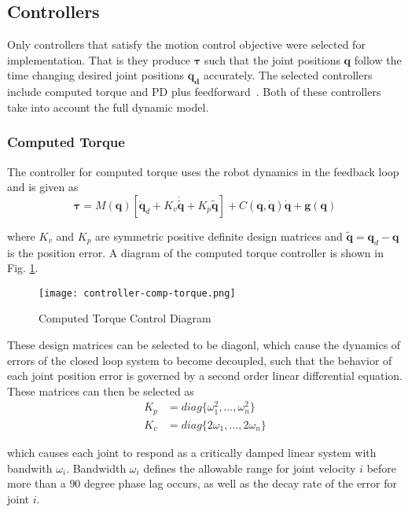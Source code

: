 \documentclass[conference]{IEEEtran}
\begin{document}
\subsection{Controllers}
Only controllers that satisfy the motion control objective were selected for
implementation. That is they produce $\boldsymbol{\tau}$ such that the joint
positions $\boldsymbol{q}$ follow the time changing desired joint positions
$\boldsymbol{q_d}$ accurately. The selected controllers include computed torque
and PD plus feedforward~\cite{kelly2007control}. Both of these controllers take
into account the full dynamic model.

\subsubsection{Computed Torque}
The controller for computed torque uses the robot dynamics in the feedback loop
and is given as
\begin{equation*}
  \boldsymbol{\tau} = M(\boldsymbol{q}) \left [ \ddot{\boldsymbol{q}}_d + K_v \dot{\tilde{\boldsymbol{q}}} + K_p \tilde{\boldsymbol{q}} \right ] + C(\boldsymbol{q}, \dot{\boldsymbol{q}})\dot{\boldsymbol{q}} + \boldsymbol{g}(\boldsymbol{q})
\end{equation*}

where $K_v$ and $K_p$ are symmetric positive definite design matrices and
$\tilde{\boldsymbol{q}} = \boldsymbol{q}_d - \boldsymbol{q}$ is the position
error. A diagram of the computed torque controller is shown in
Fig. \ref{fig:comp-torque}.

\begin{figure}[!t]
  \texttt{[image: controller-comp-torque.png]}
  \caption{Computed Torque Control Diagram}
  \label{fig:comp-torque}
\end{figure}

These design matrices can be selected to be diagonl, which cause the
dynamics of errors of the closed loop system to become decoupled, such that the
behavior of each joint position error is governed by a second order linear
differential equation. These matrices can then be selected as
\begin{align*}
  K_p &= diag\{\omega_1^2, ... , \omega_n^2\} \\
  K_v &= diag\{2\omega_1, ... , 2\omega_n\}
\end{align*}

which causes each joint to respond as a critically damped linear system with
bandwith $\omega_i$. Bandwidth $\omega_i$ defines the allowable range for joint
velocity $i$ before more than a $90$ degree phase lag occurs, as well as the
decay rate of the error for joint $i$.
\end{document}
